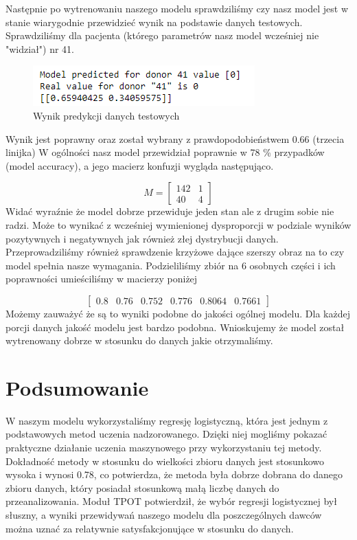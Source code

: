 \documentclass[11pt, a4paper, notitlepage]{report}
\begin{document}
\newpage
Następnie po wytrenowaniu naszego modelu sprawdziliśmy czy nasz model jest w stanie wiarygodnie przewidzieć wynik na podstawie danych testowych. Sprawdziliśmy dla pacjenta (którego parametrów nasz model wcześniej nie "widział") nr 41.  

 \begin{figure}[h!]
  \includegraphics[scale=1]{graphics/predict}
  \caption{Wynik predykcji danych testowych}
  \label{fig:predict}
\end{figure}

Wynik jest poprawny oraz został wybrany z prawdopodobieństwem 0.66 (trzecia linijka)
W ogólności nasz model przewidział poprawnie w 78 \% przypadków (model accuracy), a jego macierz konfuzji wygląda następująco.

\[
M=
  \begin{bmatrix}
    142 & 1\\
    40 & 4 
  \end{bmatrix}
\]
Widać wyraźnie że model dobrze przewiduje jeden stan ale z drugim sobie nie radzi. Może to wynikać z wcześniej wymienionej dysproporcji w podziale wyników pozytywnych i negatywnych jak również złej dystrybucji danych.
Przeprowadziliśmy również sprawdzenie krzyżowe dające szerszy obraz na to czy model spełnia nasze wymagania. Podzieliliśmy zbiór na 6 osobnych części i ich poprawności umieściliśmy w macierzy poniżej

\[
  \begin{bmatrix}
    0.8 & 0.76 & 0.752 & 0.776 & 0.8064 & 0.7661
  \end{bmatrix}
\]
Możemy zauważyć że są to wyniki podobne do jakości ogólnej modelu. Dla każdej porcji danych jakość modelu jest bardzo podobna. Wnioskujemy że model został wytrenowany dobrze w stosunku do danych jakie otrzymaliśmy.

\chapter{Podsumowanie}

W naszym modelu wykorzystaliśmy regresję logistyczną, która jest jednym z podstawowych metod uczenia nadzorowanego. Dzięki niej mogliśmy pokazać praktyczne działanie uczenia maszynowego przy wykorzystaniu tej metody. Dokładność metody w stosunku do wielkości zbioru danych jest stosunkowo wysoka i wynosi 0.78, co potwierdza, że metoda była dobrze dobrana do danego zbioru danych, który posiadał stosunkową małą liczbę danych do przeanalizowania. Moduł TPOT potwierdził, że wybór regresji logistycznej był słuszny, a wyniki przewidywań naszego modelu dla poszczególnych dawców można uznać za relatywnie satysfakcjonujące w stosunku do danych.
\end{document}
